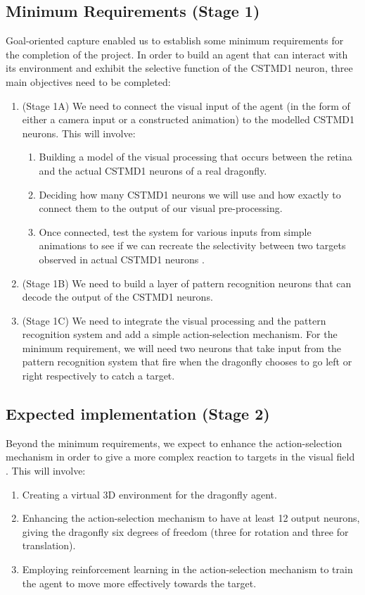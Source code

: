 \documentclass[a4paper,11pt]{article}
\begin{document}
	\subsection{Minimum Requirements (Stage 1)}
	
	Goal-oriented capture enabled us to establish some minimum requirements for the completion of the project. In order to build an agent that can interact with its environment and exhibit the selective function of the CSTMD1 neuron, three main objectives need to be completed:
\begin{enumerate}
	\item (Stage 1A) We need to connect the visual input of the agent (in the form of either a camera input or a constructed animation) to the modelled CSTMD1 neurons. This will involve:
	\begin{enumerate}
		\item Building a model of the visual processing that occurs between the retina and the actual CSTMD1 neurons of a real dragonfly.
		\item Deciding how many CSTMD1 neurons we will use and how exactly to connect them to the output of our visual pre-processing.
		\item Once connected, test the system for various inputs from simple animations to see if we can recreate the selectivity between two targets observed in actual CSTMD1 neurons \cite{w13}.
	\end{enumerate}
	\item (Stage 1B) We need to build a layer of pattern recognition neurons that can decode the output of the CSTMD1 neurons.
	\item (Stage 1C) We need to integrate the visual processing and the pattern recognition system and add a simple action-selection mechanism. For the minimum requirement, we will need two neurons that take input from the pattern recognition system that fire when the dragonfly chooses to go left or right respectively to catch a target.
\end{enumerate} 
 
 	\subsection{Expected implementation (Stage 2)}
 	
 	Beyond the minimum requirements, we expect to enhance the action-selection mechanism in order to give a more complex reaction to targets in the visual field . This will involve:
 \begin{enumerate}
 	\item Creating a virtual 3D environment for the dragonfly agent.
 	\item Enhancing the action-selection mechanism to have at least 12 output neurons, giving the dragonfly six degrees of freedom (three for rotation and three for translation).
 	\item Employing reinforcement learning in the action-selection mechanism to train the agent to move more effectively towards the target.
 \end{enumerate}
 
\end{document}
